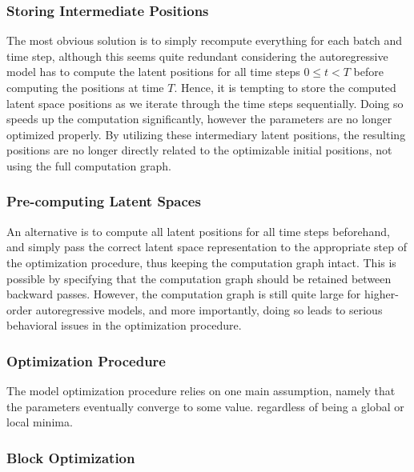        \subsubsection{Storing Intermediate Positions}
            
            The most obvious solution is to simply recompute everything for each batch and time step, although this seems quite redundant considering the autoregressive model has to compute the latent positions for all time steps $0\leq t<T$ before computing the positions at time $T$. Hence, it is tempting to store the computed latent space positions as we iterate through the time steps sequentially. Doing so speeds up the computation significantly, however the parameters are no longer optimized properly. By utilizing these intermediary latent positions, the resulting positions are no longer directly related to the optimizable initial positions, not using the full computation graph.
        
        \subsubsection{Pre-computing Latent Spaces}
            
            An alternative is to compute all latent positions for all time steps beforehand, and simply pass the correct latent space representation to the appropriate step of the optimization procedure, thus keeping the computation graph intact. This is possible by specifying that the computation graph should be retained between backward passes. However, the computation graph is still quite large for higher-order autoregressive models, and more importantly, doing so leads to serious behavioral issues in the optimization procedure.
            
        \subsubsection{Optimization Procedure}
        
            The model optimization procedure relies on one main assumption, namely that the parameters eventually converge to some value. regardless of being a global or local minima.
            
            
            
        \subsubsection{Block Optimization}
        
